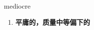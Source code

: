 
\begin{frame}
{\huge mediocre}
\begin{center}
\begin{enumerate}\Large
  \item \textbf{平庸的，质量中等偏下的}
\end{enumerate}
\end{center}
\end{frame}
